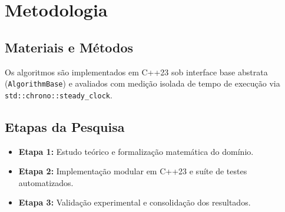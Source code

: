 \section{Metodologia}\label{sec:metodologia}

\subsection{Materiais e Métodos}
Os algoritmos são implementados em C++23 sob interface base abstrata (\lstinline{AlgorithmBase}) e avaliados com medição isolada de tempo de execução via \lstinline{std::chrono::steady_clock}.

\subsection{Etapas da Pesquisa}
\begin{itemize}[leftmargin=1.5em, itemsep=0.1em, topsep=0.15em, parsep=0em]
    \item \textbf{Etapa 1:} Estudo teórico e formalização matemática do domínio.
    \item \textbf{Etapa 2:} Implementação modular em C++23 e suíte de testes automatizados.
    \item \textbf{Etapa 3:} Validação experimental e consolidação dos resultados.
\end{itemize}

